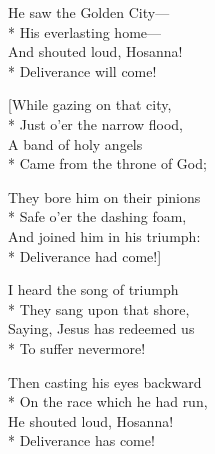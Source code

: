 He saw the Golden City—\\*
His everlasting home—\\
And shouted loud, Hosanna!\\*
Deliverance will come!

[While gazing on that city,\\*
Just o’er the narrow flood,\\
A band of holy angels\\*
Came from the throne of God;

They bore him on their pinions\\*
Safe o’er the dashing foam,\\
And joined him in his triumph:\\*
Deliverance had come!]

\versemark
I heard the song of triumph\\*
They sang upon that shore,\\
Saying, Jesus has redeemed us\\*
To suffer nevermore!

Then casting his eyes backward\\*
On the race which he had run,\\
He shouted loud, Hosanna!\\*
Deliverance has come!

